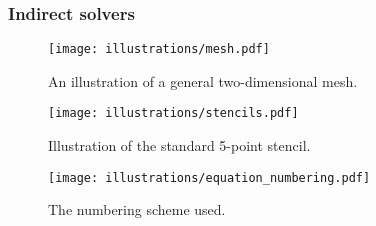\subsubsection{Indirect solvers}


\begin{figure}[htbp]
  \centering
  \texttt{[image: illustrations/mesh.pdf]}
  \caption{An illustration of a general two-dimensional mesh.}
  \label{fig:mesh}
\end{figure}

\begin{figure}[htbp]
  \centering
  \texttt{[image: illustrations/stencils.pdf]}
  \caption{Illustration of the standard 5-point stencil.}
  \label{fig:stencil}
\end{figure}

\begin{figure}[htbp]
  \centering
  \texttt{[image: illustrations/equation\_numbering.pdf]}
  \caption{The numbering scheme used.}
  \label{fig:numbering_scheme}
\end{figure}


